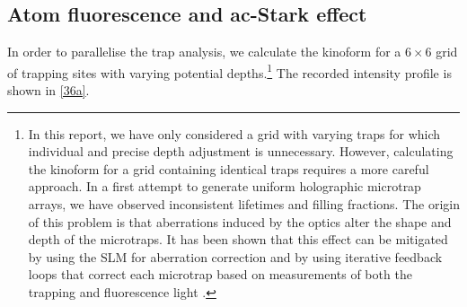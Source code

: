 \documentclass[../Thesis-IJspeert.tex]{subfiles}
\begin{document}
\subsection{Atom fluorescence and ac-Stark effect}
\label{stark}
In order to parallelise the trap analysis, we calculate the kinoform for a $6\times6$ grid of trapping sites with varying potential depths.\footnote{In this report, we have only considered a grid with varying traps for which individual and precise depth adjustment is unnecessary. However, calculating the kinoform for a grid containing identical traps requires a more careful approach. In a first attempt to generate uniform holographic microtrap arrays, we have observed inconsistent lifetimes and filling fractions. The origin of this problem is that aberrations induced by the optics alter the shape and depth of the microtraps. It has been shown that this effect can be mitigated by using the SLM for aberration correction \cite{imr2010,Kim2019} and by using iterative feedback loops that correct each microtrap based on measurements of both the trapping and fluorescence light \cite{Tamura2016}.} The recorded intensity profile is shown in \autoref{36a}.
\end{document}
